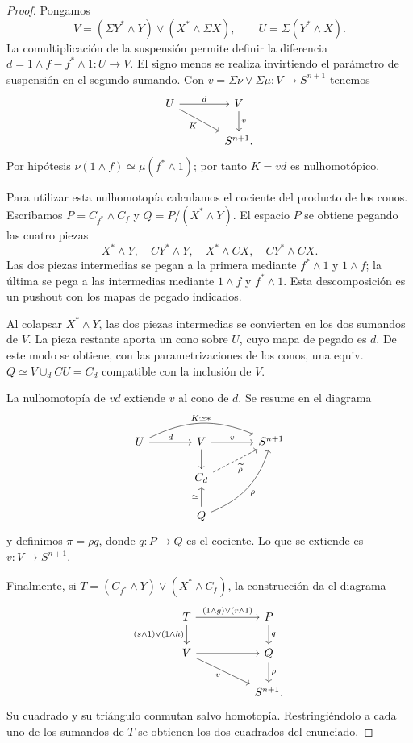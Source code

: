 \begin{proof}
Pongamos
\[
V=(\Sigma Y^*\wedge Y)\vee(X^*\wedge\Sigma X),\qquad U=\Sigma(Y^*\wedge X).
\]
La comultiplicación de la suspensión permite definir la diferencia $d=1\wedge f-f^*\wedge1\colon U\to V$. El signo menos se realiza invirtiendo el parámetro de suspensión en el segundo sumando. Con $v=\Sigma\nu\vee\Sigma\mu\colon V\to S^{n+1}$ tenemos
\[
\begin{tikzcd}[column sep=large]
U \arrow[r,"d"] \arrow[dr,"K"'] & V \arrow[d,"v"]\\
& S^{n+1}.
\end{tikzcd}
\]
Por hipótesis $\nu(1\wedge f)\simeq\mu(f^*\wedge1)$; por tanto $K=vd$ es nulhomotópico.

Para utilizar esta nulhomotopía calculamos el cociente del producto de los conos. Escribamos $P=C_{f^*}\wedge C_f$ y $Q=P/(X^*\wedge Y)$. El espacio $P$ se obtiene pegando las cuatro piezas
\[
X^*\wedge Y,\quad CY^*\wedge Y,\quad X^*\wedge CX,\quad CY^*\wedge CX.
\]
Las dos piezas intermedias se pegan a la primera mediante $f^*\wedge1$ y $1\wedge f$; la última se pega a las intermedias mediante $1\wedge f$ y $f^*\wedge1$. Esta descomposición es un pushout con los mapas de pegado indicados.

Al colapsar $X^*\wedge Y$, las dos piezas intermedias se convierten en los dos sumandos de $V$. La pieza restante aporta un cono sobre $U$, cuyo mapa de pegado es $d$. De este modo se obtiene, con las parametrizaciones de los conos, una equiv. $Q\simeq V\cup_d CU=C_d$ compatible con la inclusión de $V$.

La nulhomotopía de $vd$ extiende $v$ al cono de $d$. Se resume en el diagrama
\[
\begin{tikzcd}[column sep=large]
U \arrow[r,"d"] \arrow[rr,bend left=25,"K\simeq *"] & V \arrow[r,"v"] \arrow[d] & S^{n+1}\\
& C_d \arrow[ur,dashed,"\widetilde\rho"'] &\\
& Q \arrow[u,"\simeq"] \arrow[uur,bend right=25,"\rho"'] &
\end{tikzcd}
\]
y definimos $\pi=\rho q$, donde $q\colon P\to Q$ es el cociente. Lo que se extiende es $v\colon V\to S^{n+1}$.

Finalmente, si $T=(C_{f^*}\wedge Y)\vee(X^*\wedge C_f)$, la construcción da el diagrama
\[
\begin{tikzcd}[column sep=huge]
T \arrow[r,"(1\wedge g)\vee(r\wedge1)"] \arrow[d,"(s\wedge1)\vee(1\wedge h)"'] & P \arrow[d,"q"]\\
V \arrow[r] \arrow[dr,"v"'] & Q \arrow[d,"\rho"]\\
& S^{n+1}.
\end{tikzcd}
\]
Su cuadrado y su triángulo conmutan salvo homotopía. Restringiéndolo a cada uno de los sumandos de $T$ se obtienen los dos cuadrados del enunciado.
\end{proof}


